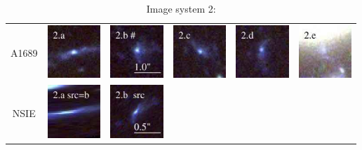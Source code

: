 \documentclass[useAMS,usenatbib]{mn2e}
\begin{document}
\begin{table}
  \caption{Image system 2:}\vspace{0mm}
  \begin{tabular}{cccccc}
    \multicolumn{1}{m{1cm}}{{\Large A1689}}
    & \multicolumn{1}{m{1.7cm}}{\includegraphics[height=2.00cm,clip]{figs/nsie_img/rgb.img_2_a.ps}}
    & \multicolumn{1}{m{1.7cm}}{\includegraphics[height=2.00cm,clip]{figs/nsie_img/rgb.img_2_b.ps}}
    & \multicolumn{1}{m{1.7cm}}{\includegraphics[height=2.00cm,clip]{figs/nsie_img/rgb.img_2_c.ps}}
    & \multicolumn{1}{m{1.7cm}}{\includegraphics[height=2.00cm,clip]{figs/nsie_img/rgb.img_2_d.ps}}
    & \multicolumn{1}{m{1.7cm}}{\includegraphics[height=2.00cm,clip]{figs/nsie_img/rgb.img_2_e.ps}} \\
    \multicolumn{1}{m{1cm}}{{\Large NSIE}}
    & \multicolumn{1}{m{1.7cm}}{\includegraphics[height=2.00cm,clip]{figs/nsie_img/rgb.pre_2_a_b_tri.ps}}
    & \multicolumn{1}{m{1.7cm}}{\includegraphics[height=2.00cm,clip]{figs/nsie_img/rgb.src_2_b.ps}}

\end{tabular}
\end{table}
\end{document}
